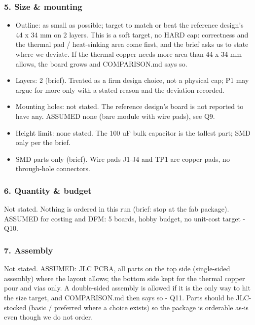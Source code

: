 \documentclass[11pt,a4paper]{article}
\begin{document}
\subsubsection*{5. Size \& mounting}
\begin{itemize}
\item Outline: as small as possible; target to match or beat the reference design's 44 x 34 mm on 2 layers. This is a
soft target, no HARD cap: correctness and the thermal pad / heat-sinking area come first, and the
brief asks us to state where we deviate. If the thermal copper needs more area than 44 x 34 mm
allows, the board grows and COMPARISON.md says so.
\item Layers: 2 (brief). Treated as a firm design choice, not a physical cap; P1 may argue for more only
with a stated reason and the deviation recorded.
\item Mounting holes: not stated. The reference design's board is not reported to have any. ASSUMED none (bare module
with wire pads), see Q9.
\item Height limit: none stated. The 100 uF bulk capacitor is the tallest part; SMD only per the brief.
\item SMD parts only (brief). Wire pads J1-J4 and TP1 are copper pads, no through-hole connectors.
\end{itemize}
\subsubsection*{6. Quantity \& budget}
Not stated. Nothing is ordered in this run (brief: stop at the fab package). ASSUMED for costing and DFM: 5 boards, hobby budget, no unit-cost target - Q10.

\subsubsection*{7. Assembly}
Not stated. ASSUMED: JLC PCBA, all parts on the top side (single-sided assembly) where the layout allows; the bottom side kept for the thermal copper pour and vias only. A double-sided assembly is allowed if it is the only way to hit the size target, and COMPARISON.md then says so - Q11. Parts should be JLC-stocked (basic / preferred where a choice exists) so the package is orderable as-is even though we do not order.
\end{document}
